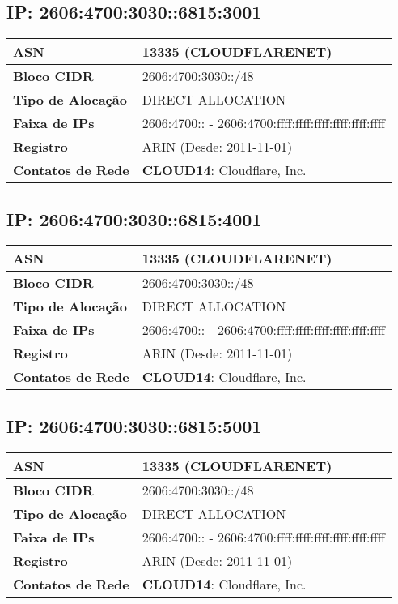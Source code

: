     \subsection{IP: 2606:4700:3030::6815:3001}
    \begin{tabular}{|l|l|}
    \hline
    \textbf{ASN} & 13335 (CLOUDFLARENET) \\ \hline
    \textbf{Bloco CIDR} & 2606:4700:3030::/48 \\ \hline
    \textbf{Tipo de Alocação} & DIRECT ALLOCATION \\ \hline
    \textbf{Faixa de IPs} & 2606:4700:: - 2606:4700:ffff:ffff:ffff:ffff:ffff:ffff \\ \hline
    \textbf{Registro} & ARIN (Desde: 2011-11-01) \\ \hline
        
\textbf{Contatos de Rede} & \textbf{CLOUD14}: Cloudflare, Inc. 
\\ \hline
\end{tabular}


    \subsection{IP: 2606:4700:3030::6815:4001}
    \begin{tabular}{|l|l|}
    \hline
    \textbf{ASN} & 13335 (CLOUDFLARENET) \\ \hline
    \textbf{Bloco CIDR} & 2606:4700:3030::/48 \\ \hline
    \textbf{Tipo de Alocação} & DIRECT ALLOCATION \\ \hline
    \textbf{Faixa de IPs} & 2606:4700:: - 2606:4700:ffff:ffff:ffff:ffff:ffff:ffff \\ \hline
    \textbf{Registro} & ARIN (Desde: 2011-11-01) \\ \hline
        
\textbf{Contatos de Rede} & \textbf{CLOUD14}: Cloudflare, Inc. 
\\ \hline
\end{tabular}


    \subsection{IP: 2606:4700:3030::6815:5001}
    \begin{tabular}{|l|l|}
    \hline
    \textbf{ASN} & 13335 (CLOUDFLARENET) \\ \hline
    \textbf{Bloco CIDR} & 2606:4700:3030::/48 \\ \hline
    \textbf{Tipo de Alocação} & DIRECT ALLOCATION \\ \hline
    \textbf{Faixa de IPs} & 2606:4700:: - 2606:4700:ffff:ffff:ffff:ffff:ffff:ffff \\ \hline
    \textbf{Registro} & ARIN (Desde: 2011-11-01) \\ \hline
        
\textbf{Contatos de Rede} & \textbf{CLOUD14}: Cloudflare, Inc. 
\\ \hline
\end{tabular}


